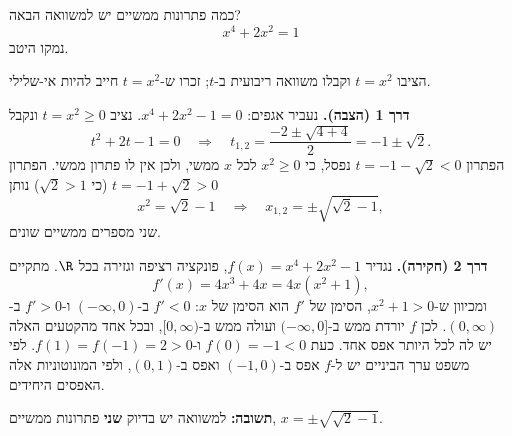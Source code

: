 
\begin{question}
כמה פתרונות ממשיים יש למשוואה הבאה?
\[ x^4 + 2x^2 = 1 \]
נמקו היטב.
\end{question}

\begin{hint}
הציבו $t = x^2$ וקבלו משוואה ריבועית ב-$t$; זכרו ש-$t = x^2$ חייב להיות אי-שלילי.
\end{hint}

\begin{solution}
\textbf{דרך 1 (הצבה).} נעביר אגפים: $x^4 + 2x^2 - 1 = 0$. נציב $t = x^2 \ge 0$ ונקבל
\[ t^2 + 2t - 1 = 0 \quad\Longrightarrow\quad t_{1,2} = \frac{-2 \pm \sqrt{4 + 4}}{2} = -1 \pm \sqrt{2}. \]
הפתרון $t = -1 - \sqrt{2} < 0$ נפסל, כי $x^2 \ge 0$ לכל $x$ ממשי, ולכן אין לו פתרון ממשי.
הפתרון $t = -1 + \sqrt{2} > 0$ (כי $\sqrt 2 > 1$) נותן
\[ x^2 = \sqrt{2} - 1 \quad\Longrightarrow\quad x_{1,2} = \pm\sqrt{\sqrt{2} - 1}, \]
שני מספרים ממשיים שונים.

\textbf{דרך 2 (חקירה).} נגדיר $f(x) = x^4 + 2x^2 - 1$, פונקציה רציפה וגזירה בכל $\R$. מתקיים
\[ f'(x) = 4x^3 + 4x = 4x(x^2 + 1), \]
ומכיוון ש-$x^2 + 1 > 0$, הסימן של $f'$ הוא הסימן של $x$: $f' < 0$ ב-$(-\infty, 0)$ ו-$f' > 0$ ב-$(0, \infty)$.
לכן $f$ יורדת ממש ב-$(-\infty, 0]$ ועולה ממש ב-$[0, \infty)$, ובכל אחד מהקטעים האלה יש לה לכל היותר אפס אחד.
כעת $f(0) = -1 < 0$ ו-$f(1) = f(-1) = 2 > 0$. לפי משפט ערך הביניים יש ל-$f$ אפס ב-$(-1, 0)$ ואפס ב-$(0, 1)$, ולפי המונוטוניות אלה האפסים היחידים.

\textbf{תשובה:} למשוואה יש בדיוק \textbf{שני} פתרונות ממשיים, $x = \pm\sqrt{\sqrt 2 - 1}$.
\end{solution}
